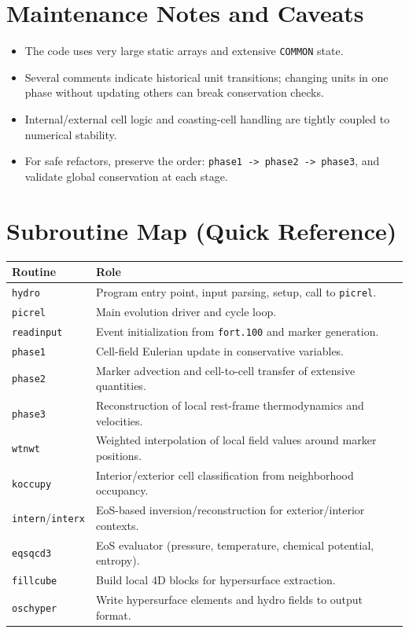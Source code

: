 \documentclass[11pt,a4paper]{article}
\begin{document}
\section{Maintenance Notes and Caveats}
\begin{itemize}
\item The code uses very large static arrays and extensive \texttt{COMMON} state.
\item Several comments indicate historical unit transitions; changing units in one
      phase without updating others can break conservation checks.
\item Internal/external cell logic and coasting-cell handling are tightly coupled
      to numerical stability.
\item For safe refactors, preserve the order:
\texttt{phase1 -> phase2 -> phase3}, and validate global conservation at each
stage.
\end{itemize}

\section{Subroutine Map (Quick Reference)}
\begin{longtable}{|p{3.2cm}|p{10cm}|}
\hline
Routine & Role \\\hline
\texttt{hydro} & Program entry point, input parsing, setup, call to \texttt{picrel}. \\\hline
\texttt{picrel} & Main evolution driver and cycle loop. \\\hline
\texttt{readinput} & Event initialization from \texttt{fort.100} and marker generation. \\\hline
\texttt{phase1} & Cell-field Eulerian update in conservative variables. \\\hline
\texttt{phase2} & Marker advection and cell-to-cell transfer of extensive quantities. \\\hline
\texttt{phase3} & Reconstruction of local rest-frame thermodynamics and velocities. \\\hline
\texttt{wtnwt} & Weighted interpolation of local field values around marker positions. \\\hline
\texttt{koccupy} & Interior/exterior cell classification from neighborhood occupancy. \\\hline
\texttt{intern}/\texttt{interx} & EoS-based inversion/reconstruction for exterior/interior contexts. \\\hline
\texttt{eqsqcd3} & EoS evaluator (pressure, temperature, chemical potential, entropy). \\\hline
\texttt{fillcube} & Build local 4D blocks for hypersurface extraction. \\\hline
\texttt{oschyper} & Write hypersurface elements and hydro fields to output format. \\\hline
\hline
\end{longtable}
\end{document}
